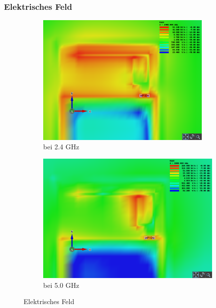 \subsubsection{Elektrisches Feld}
\begin{figure}[h!]
	\begin{center}
		\begin{subfigure}[t]{0.49\textwidth}
			\begin{center}
				\includegraphics[width=0.94\textwidth]{../fig/plt/crazy_stuff_l4_pcb_v2c_laptop_1a_105_2ghz4_3d_electric_field_xy.png}
				\caption{bei 2.4 GHz}
				\label{fig:electricfield_2_4}
			\end{center}
		\end{subfigure}
		\begin{subfigure}[t]{0.49\textwidth}
			\begin{center}
				\includegraphics[width=1\textwidth]{../fig/plt/crazy_stuff_l4_pcb_v2c_laptop_1a_105_5ghz_3d_electric_field_xy.png}
				\caption{bei 5.0 GHz}
				\label{fig:electricfield_5_0}
			\end{center}
		\end{subfigure}
		\caption{Elektrisches Feld}
		\label{fig:electricfield}
	\end{center}
\end{figure}

